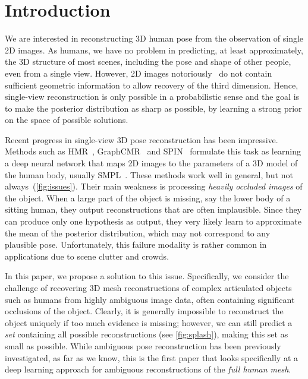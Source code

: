 \section{Introduction}\label{s:intro}

We are interested in reconstructing 3D human pose from the observation of single 2D images.
As humans, we have no problem in predicting, at least approximately, the 3D structure of most scenes, including the pose and shape of other people, even from a single view.
However, 2D images notoriously~\citep{Faugeras01geometry} do not contain sufficient geometric information to allow recovery of the third dimension.
Hence, single-view reconstruction is only possible in a probabilistic sense and the goal is to make the posterior distribution as sharp as possible, by learning a strong prior on the space of possible solutions.

Recent progress in single-view 3D pose reconstruction has been impressive.
Methods such as HMR~\citep{kanazawa18end-to-end}, GraphCMR~\citep{kolotouros19convolutional} and SPIN~\citep{kolotouros19learning} formulate this task as learning a deep neural network that maps 2D images to the parameters of a 3D model of the human body, usually SMPL~\cite{loper15smpl}.
These methods work well in general, but not always~(\cref{fig:issues}).
Their main weakness is processing \emph{heavily occluded images} of the object.
When a large part of the object is missing, say the lower body of a sitting human, they output reconstructions that are often implausible.
Since they can produce only one hypothesis as output, they very likely learn to approximate the mean of the posterior distribution, which may not correspond to any plausible pose.
Unfortunately, this failure modality is rather common in applications due to scene clutter and crowds.

In this paper, we propose a solution to this issue.
Specifically, we consider the challenge of recovering 3D mesh reconstructions of complex articulated objects such as humans from highly ambiguous image data, often containing significant occlusions of the object.
Clearly, it is generally impossible to reconstruct the object uniquely if too much evidence is missing; however, we can still predict a \emph{set} containing all possible reconstructions (see \cref{fig:splash}), making this set as small as possible.
While ambiguous pose reconstruction has been previously investigated, as far as we know, this is the first paper that looks specifically at a deep learning approach for ambiguous reconstructions of the \emph{full human mesh}.


